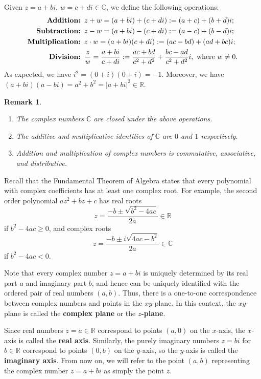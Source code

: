 \documentclass[10pt]{article}
\newcommand{\R}{\mathbb{R}}
\newcommand{\C}{\mathbb{C}}
\theoremstyle{newstyle}
\newtheorem{remark}[thm]{Remark}
\begin{document}
Given $z = a+bi,\, w = c+di \in \C$, we define the following operations: 
\begin{align*}
    \text{\bf Addition: } & z+w = (a+bi)+(c+di) := (a+c) + (b+d)i; \\
    \text{\bf Subtraction: } & z-w = (a+bi)-(c+di) := (a-c) + (b-d)i; \\
    \text{\bf Multiplication: } & z\cdot w = (a+bi)(c+di) := (ac-bd) + (ad+bc)i; \\ 
    \text{\bf Division: } & \frac{z}w = \frac{a+bi}{c+di} := \frac{ac+bd}{c^2+d^2} 
    + \frac{bc-ad}{c^2+d^2}i, \text{ where $w \neq 0$.}
\end{align*}
As expected, we have $i^2 = (0+i)(0+i) = -1$. Moreover, we have $(a+bi)(a-bi) = 
a^2 + b^2 = |a+bi|^2 \in \R$. 

\begin{remark}~
\begin{enumerate}[(1)]
    \item The complex numbers $\C$ are closed under the above operations. 
    \item The additive and multiplicative identities of $\C$ are $0$ and $1$ respectively. 
    \item Addition and multiplication of complex numbers is commutative, associative, 
    and distributive. 
\end{enumerate}
\end{remark}

Recall that the Fundamental Theorem of Algebra states that every polynomial with complex 
coefficients has at least one complex root. For example, the second order polynomial 
$az^2 + bz + c$ has real roots 
\[ z = \frac{-b \pm \sqrt{b^2-4ac}}{2a} \in \R \]
if $b^2 - 4ac \geq 0$, and complex roots 
\[ z = \frac{-b \pm i\sqrt{4ac-b^2}}{2a} \in \C \]
if $b^2 - 4ac < 0$. 

Note that every complex number $z = a+bi$ is uniquely determined by its real part $a$ and 
imaginary part $b$, and hence can be uniquely identified with the ordered pair of real 
numbers $(a, b)$. Thus, there is a one-to-one correspondence between complex numbers and points in the 
$xy$-plane. In this context, the $xy$-plane is called the {\bf complex plane} or 
the {\bf $z$-plane}. 

Since real numbers $z = a \in \R$ correspond to points $(a, 0)$ on the $x$-axis, 
the $x$-axis is called the {\bf real axis}. Similarly, the purely imaginary numbers 
$z = bi$ for $b \in \R$ correspond to points $(0, b)$ on the $y$-axis, so the 
$y$-axis is called the {\bf imaginary axis}. From now on, we will refer to the 
point $(a, b)$ representing the complex number $z = a+bi$ as simply the point $z$. 
\end{document}
